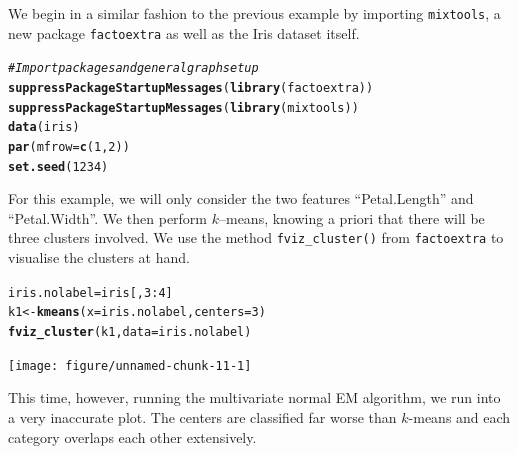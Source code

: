 \documentclass{article}\usepackage[]{graphicx}\usepackage[]{xcolor}
\makeatletter
\newcommand{\hlnum}[1]{\textcolor[rgb]{0.686,0.059,0.569}{#1}}%
\newcommand{\hlcom}[1]{\textcolor[rgb]{0.678,0.584,0.686}{\textit{#1}}}%
\newcommand{\hlopt}[1]{\textcolor[rgb]{0,0,0}{#1}}%
\newcommand{\hlstd}[1]{\textcolor[rgb]{0.345,0.345,0.345}{#1}}%
\newcommand{\hlkwb}[1]{\textcolor[rgb]{0.69,0.353,0.396}{#1}}%
\newcommand{\hlkwc}[1]{\textcolor[rgb]{0.333,0.667,0.333}{#1}}%
\newcommand{\hlkwd}[1]{\textcolor[rgb]{0.737,0.353,0.396}{\textbf{#1}}}%
\newenvironment{kframe}{%
 \def\at@end@of@kframe{}%
 \ifinner\ifhmode%
  \def\at@end@of@kframe{\end{minipage}}%
  \begin{minipage}{\columnwidth}%
 \fi\fi%
 \def\FrameCommand##1{\hskip\@totalleftmargin \hskip-\fboxsep
 \colorbox{shadecolor}{##1}\hskip-\fboxsep
     \hskip-\linewidth \hskip-\@totalleftmargin \hskip\columnwidth}%
 \MakeFramed {\advance\hsize-\width
   \@totalleftmargin\z@ \linewidth\hsize
   \@setminipage}}%
 {\par\unskip\endMakeFramed%
 \at@end@of@kframe}
\newenvironment{knitrout}{}{} %
\theoremstyle{plain}
\theoremstyle{definition}
\theoremstyle{remark}
\makeatother
\begin{document}
We begin in a similar fashion to the previous example by importing \texttt{mixtools}, a new package \texttt{factoextra} as well as the Iris dataset itself.
\singlespacing
\begin{knitrout}
\color{fgcolor}\begin{kframe}
\begin{alltt}
  \hlcom{# Import packages and general graph setup}
  \hlkwd{suppressPackageStartupMessages}\hlstd{(}\hlkwd{library}\hlstd{(factoextra))}
  \hlkwd{suppressPackageStartupMessages}\hlstd{(}\hlkwd{library}\hlstd{(mixtools))}
  \hlkwd{data}\hlstd{(iris)}
  \hlkwd{par}\hlstd{(}\hlkwc{mfrow}\hlstd{=}\hlkwd{c}\hlstd{(}\hlnum{1}\hlstd{,}\hlnum{2}\hlstd{))}
  \hlkwd{set.seed}\hlstd{(}\hlnum{1234}\hlstd{)}
\end{alltt}
\end{kframe}
\end{knitrout}

For this example, we will only consider the two features ``Petal.Length'' and ``Petal.Width''. We then perform $k$--means, knowing a priori that there will be three clusters involved. We use the method \texttt{fviz\_cluster()} from \texttt{factoextra} to visualise the clusters at hand. \\

\begin{knitrout}
\color{fgcolor}\begin{kframe}
\begin{alltt}
  \hlstd{iris.nolabel} \hlkwb{=} \hlstd{iris[,}\hlnum{3}\hlopt{:}\hlnum{4}\hlstd{]}
  \hlstd{k1} \hlkwb{<-} \hlkwd{kmeans}\hlstd{(}\hlkwc{x}\hlstd{=iris.nolabel,} \hlkwc{centers}\hlstd{=}\hlnum{3}\hlstd{)}
  \hlkwd{fviz_cluster}\hlstd{(k1,} \hlkwc{data}\hlstd{=iris.nolabel)}
\end{alltt}
\end{kframe}

{\centering \texttt{[image: figure/unnamed-chunk-11-1]} 

}


\end{knitrout}

This time, however, running the multivariate normal EM algorithm, we run into a very inaccurate plot. The centers are classified far worse than $k$-means and each category overlaps each other extensively. \\ 
\end{document}

